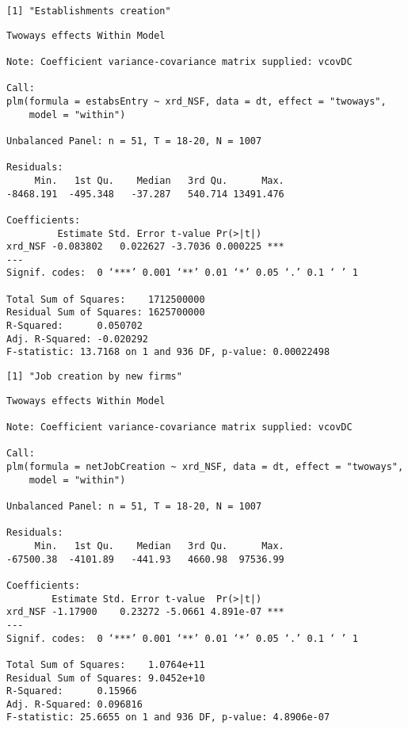 \documentclass[11pt]{article}
\begin{document}
    \begin{Verbatim}[commandchars=\\\{\}]
[1] "Establishments creation"

    \end{Verbatim}

    
    \begin{verbatim}
Twoways effects Within Model

Note: Coefficient variance-covariance matrix supplied: vcovDC

Call:
plm(formula = estabsEntry ~ xrd_NSF, data = dt, effect = "twoways", 
    model = "within")

Unbalanced Panel: n = 51, T = 18-20, N = 1007

Residuals:
     Min.   1st Qu.    Median   3rd Qu.      Max. 
-8468.191  -495.348   -37.287   540.714 13491.476 

Coefficients:
         Estimate Std. Error t-value Pr(>|t|)    
xrd_NSF -0.083802   0.022627 -3.7036 0.000225 ***
---
Signif. codes:  0 ‘***’ 0.001 ‘**’ 0.01 ‘*’ 0.05 ‘.’ 0.1 ‘ ’ 1

Total Sum of Squares:    1712500000
Residual Sum of Squares: 1625700000
R-Squared:      0.050702
Adj. R-Squared: -0.020292
F-statistic: 13.7168 on 1 and 936 DF, p-value: 0.00022498
    \end{verbatim}

    
    \begin{Verbatim}[commandchars=\\\{\}]
[1] "Job creation by new firms"

    \end{Verbatim}

    
    \begin{verbatim}
Twoways effects Within Model

Note: Coefficient variance-covariance matrix supplied: vcovDC

Call:
plm(formula = netJobCreation ~ xrd_NSF, data = dt, effect = "twoways", 
    model = "within")

Unbalanced Panel: n = 51, T = 18-20, N = 1007

Residuals:
     Min.   1st Qu.    Median   3rd Qu.      Max. 
-67500.38  -4101.89   -441.93   4660.98  97536.99 

Coefficients:
        Estimate Std. Error t-value  Pr(>|t|)    
xrd_NSF -1.17900    0.23272 -5.0661 4.891e-07 ***
---
Signif. codes:  0 ‘***’ 0.001 ‘**’ 0.01 ‘*’ 0.05 ‘.’ 0.1 ‘ ’ 1

Total Sum of Squares:    1.0764e+11
Residual Sum of Squares: 9.0452e+10
R-Squared:      0.15966
Adj. R-Squared: 0.096816
F-statistic: 25.6655 on 1 and 936 DF, p-value: 4.8906e-07
    \end{verbatim}
\end{document}
